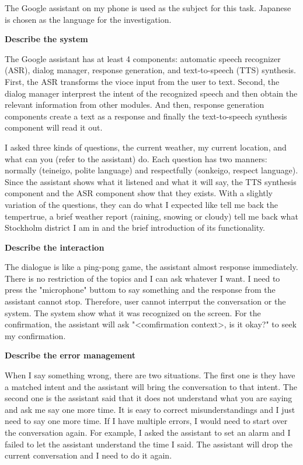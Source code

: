 \documentclass[12pt]{article}
\newenvironment{problem}[2][Problem]{\begin{trivlist}
\item[\hskip \labelsep {\bfseries #1}\hskip \labelsep {\bfseries #2.}]}{\end{trivlist}}
\begin{document}
\begin{problem}{3.3}
    The Google assistant on my phone is used as the subject for this task.
    Japanese is chosen as the language for the investigation.

    \textbf{Describe the system}

    The Google assistant has at least 4 components: automatic speech recognizer (ASR),
    dialog manager, response generation, 
    and text-to-speech (TTS) synthesis. First, the ASR transforms the vioce input 
    from the user to text. Second, the dialog manager interprest the intent
    of the recognized speech and then obtain the relevant information from 
    other modules. And then, response generation components create a text as 
    a response and finally the text-to-speech synthesis component will read it
    out.

    I asked three kinds of questions, the current weather, 
    my current location, and
    what can you (refer to the assistant) do. Each question has two manners:
    normally (teineigo, polite language) and respectfully (sonkeigo, respect language).
    Since the assistant shows what it listened and what it will say, the TTS
    synthesis component and the ASR component show that they exists. With a 
    slightly variation of the questions, they can do what I expected like 
    tell me back the tempertrue, a brief weather report (raining, snowing or cloudy)
    tell me back what Stockholm district I am in and the brief introduction of 
    its functionality.

    \textbf{Describe the interaction}

    The dialogue is like a ping-pong game, the assistant almost response immediately.
    There is no restriction of the topics and I can ask whatever I want.
    I need to press the "microphone" buttom to say something and the response 
    from the assistant cannot stop. Therefore, user cannot interrput the conversation
    or the system. The system show what it was recognized on the screen. For the
    confirmation, the assistant will ask "<comfirmation context>, is it okay?" to
    seek my confirmation.

    \textbf{Describe the error management}

    When I say something wrong, there are two situations. The first one is they
    have a matched intent and the assistant will bring the conversation to that 
    intent. The second one is the assistant said that it does not understand
    what you are saying and ask me say one more time. It is easy to correct
    misunderstandings and I just need to say one more time. If I have multiple
    errors, I would need to start over the conversation again. For example, 
    I asked the assistant to set an alarm and I failed to let the assistant
    understand the time I said. The assistant will drop the current conversation
    and I need to do it again.


\end{problem}
\end{document}
